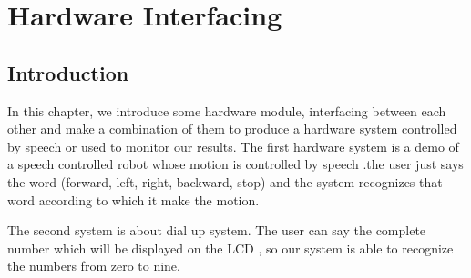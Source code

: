 \documentclass[12pt, a4paper, twoside]{report}
\begin{document}
\chapter{Hardware Interfacing}
\section{Introduction}
In this chapter, we introduce some hardware module, interfacing between each other and make a combination of them to produce a hardware system   controlled by speech or used to monitor our results. The first hardware system is a demo of a speech controlled robot whose motion is controlled by speech .the user just says the word (forward, left, right, backward, stop) and the system recognizes that word according to which it make the motion.
\par
The second system is about dial up system. The user can say the complete number which will be displayed on the LCD , so our system is able to recognize the numbers from zero to nine.
\end{document}
